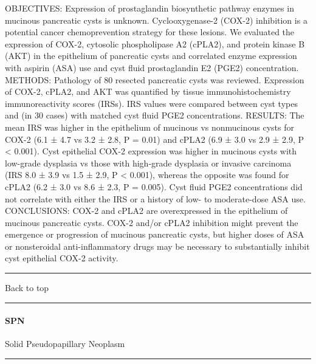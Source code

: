 \documentclass[]{article}
\let\oldparagraph\paragraph
\renewcommand{\paragraph}[1]{\oldparagraph{#1}\mbox{}}
\begin{document}
OBJECTIVES: Expression of prostaglandin biosynthetic pathway enzymes in
mucinous pancreatic cysts is unknown. Cyclooxygenase-2 (COX-2)
inhibition is a potential cancer chemoprevention strategy for these
lesions. We evaluated the expression of COX-2, cytosolic phospholipase
A2 (cPLA2), and protein kinase B (AKT) in the epithelium of pancreatic
cysts and correlated enzyme expression with aspirin (ASA) use and cyst
fluid prostaglandin E2 (PGE2) concentration. METHODS: Pathology of 80
resected pancreatic cysts was reviewed. Expression of COX-2, cPLA2, and
AKT was quantified by tissue immunohistochemistry immunoreactivity
scores (IRSs). IRS values were compared between cyst types and (in 30
cases) with matched cyst fluid PGE2 concentrations. RESULTS: The mean
IRS was higher in the epithelium of mucinous vs nonmucinous cysts for
COX-2 (6.1 ± 4.7 vs 3.2 ± 2.8, P = 0.01) and cPLA2 (6.9 ± 3.0 vs 2.9 ±
2.9, P \textless{} 0.001). Cyst epithelial COX-2 expression was higher
in mucinous cysts with low-grade dysplasia vs those with high-grade
dysplasia or invasive carcinoma (IRS 8.0 ± 3.9 vs 1.5 ± 2.9, P
\textless{} 0.001), whereas the opposite was found for cPLA2 (6.2 ± 3.0
vs 8.6 ± 2.3, P = 0.005). Cyst fluid PGE2 concentrations did not
correlate with either the IRS or a history of low- to moderate-dose ASA
use. CONCLUSIONS: COX-2 and cPLA2 are overexpressed in the epithelium of
mucinous pancreatic cysts. COX-2 and/or cPLA2 inhibition might prevent
the emergence or progression of mucinous pancreatic cysts, but higher
doses of ASA or nonsteroidal anti-inflammatory drugs may be necessary to
substantially inhibit cyst epithelial COX-2 activity.

{}

{}

\begin{center}\rule{0.5\linewidth}{\linethickness}\end{center}

Back to top

\begin{center}\rule{0.5\linewidth}{\linethickness}\end{center}

\pagebreak

\hypertarget{spn}{%
\paragraph{SPN}\label{spn}}

Solid Pseudopapillary Neoplasm

\begin{center}\rule{0.5\linewidth}{\linethickness}\end{center}
\end{document}
